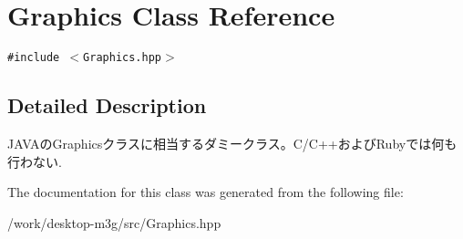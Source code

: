 \hypertarget{classm3g_1_1Graphics}{
\section{Graphics Class Reference}
\label{classm3g_1_1Graphics}
}
{\tt \#include $<$Graphics.hpp$>$}



\subsection{Detailed Description}
JAVAのGraphicsクラスに相当するダミークラス。C/C++およびRubyでは何も行わない. 

The documentation for this class was generated from the following file:\begin{CompactItemize}
\item 
/work/desktop-m3g/src/Graphics.hpp\end{CompactItemize}
